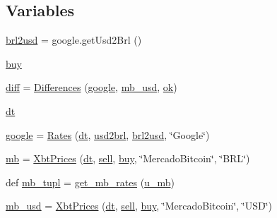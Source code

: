 \subsection*{Variables}
\begin{DoxyCompactItemize}
\item 
\hyperlink{namespaceraw__urlparser_ae7e1c02df9ab0102e017e31885aa6431}{brl2usd} = google.\+get\+Usd2\+Brl ()
\item 
\hyperlink{namespaceraw__urlparser_a2b9c66c8d5157cd95ecb738719c8a873}{buy}
\item 
\hyperlink{namespaceraw__urlparser_a86dc49fc55812ccc7eeda441b0fce83c}{diff} = \hyperlink{classraw__urlparser_1_1_differences}{Differences} (\hyperlink{namespaceraw__urlparser_a1b812abf4fbbd8478dca91446c66b646}{google}, \hyperlink{namespaceraw__urlparser_adb426668060d85f4fbd24135e258a8b3}{mb\+\_\+usd}, \hyperlink{namespaceraw__urlparser_aa0dcadbc04ec5d09f7a2dabb865000c8}{ok})
\item 
\hyperlink{namespaceraw__urlparser_acbaf2eef75f4aa43e1f6659c0fd34836}{dt}
\item 
\hyperlink{namespaceraw__urlparser_a1b812abf4fbbd8478dca91446c66b646}{google} = \hyperlink{classraw__urlparser_1_1_rates}{Rates} (\hyperlink{namespaceraw__urlparser_acbaf2eef75f4aa43e1f6659c0fd34836}{dt}, \hyperlink{namespaceraw__urlparser_adb724d2d0b7c561e8b0c53a42831efce}{usd2brl}, \hyperlink{namespaceraw__urlparser_ae7e1c02df9ab0102e017e31885aa6431}{brl2usd}, \char`\"{}Google\char`\"{})
\item 
\hyperlink{namespaceraw__urlparser_a76acf8d303c15079b0560eace3e9720f}{mb} = \hyperlink{classraw__urlparser_1_1_xbt_prices}{Xbt\+Prices} (\hyperlink{namespaceraw__urlparser_acbaf2eef75f4aa43e1f6659c0fd34836}{dt}, \hyperlink{namespaceraw__urlparser_a9f1ba2a5cd520bb41ac4bee751047679}{sell}, \hyperlink{namespaceraw__urlparser_a2b9c66c8d5157cd95ecb738719c8a873}{buy}, \char`\"{}Mercado\+Bitcoin\char`\"{}, \char`\"{}B\+RL\char`\"{})
\item 
def \hyperlink{namespaceraw__urlparser_a5d0646d42075b7bea171f53c46c3c938}{mb\+\_\+tupl} = \hyperlink{namespaceraw__urlparser_ae2341143e866401a993a5a964610f7a6}{get\+\_\+mb\+\_\+rates} (\hyperlink{namespaceraw__urlparser_a9a840f174b92a24c415b88c87e84b73d}{u\+\_\+mb})
\item 
\hyperlink{namespaceraw__urlparser_adb426668060d85f4fbd24135e258a8b3}{mb\+\_\+usd} = \hyperlink{classraw__urlparser_1_1_xbt_prices}{Xbt\+Prices} (\hyperlink{namespaceraw__urlparser_acbaf2eef75f4aa43e1f6659c0fd34836}{dt}, \hyperlink{namespaceraw__urlparser_a9f1ba2a5cd520bb41ac4bee751047679}{sell}, \hyperlink{namespaceraw__urlparser_a2b9c66c8d5157cd95ecb738719c8a873}{buy}, \char`\"{}Mercado\+Bitcoin\char`\"{}, \char`\"{}U\+SD\char`\"{})

\end{DoxyCompactItemize}
